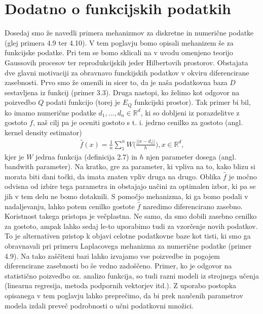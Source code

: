 \documentclass[12pt,a4paper]{amsart}
\theoremstyle{definition} %
\theoremstyle{plain} %
\begin{document}
\section{Dodatno o funkcijskih podatkih}
Dosedaj smo že navedli primera mehanizmov za diskretne in numerične podatke (glej primera 4.9 ter 4.10). V tem poglavju bomo opisali mehanizem še  za funkcijske podatke. Pri tem se bomo sklicali na v uvodu omenjeno teorijo Gaussovih procesov ter reprodukcijskih jeder Hilbertovih prostorov.
\newline
\newline
Obstajata dve glavni motivaciji za obravnavo funckijskih podatkov v okviru diferencirane zasebnosti. Prvo smo že omenili in sicer to, da je naša podatkovna baza $D$ sestavljena iz funkcij (primer 3.3). Druga nastopi, ko želimo kot odgovor na poizvedbo $Q$ podati funkcijo (torej je $E_Q$ funkcijski prostor). Tak primer bi bil, ko imamo numerične podatke $d_1, ..., d_n \in \mathbb{R}^d$, ki so dobljeni iz porazdelitve z gostoto $f$, naš cilj pa je oceniti gostoto s t. i. jedrno cenilko za gostoto (angl. kernel density estimator) 
\begin{gather*}
\hat{f}(x)=\frac{1}{n}\sum_{1}^{n}W\Big(\frac{||x-d_i||}{h}\Big), x \in \mathbb{R}^d,
\end{gather*}
kjer je $W$ jedrna funkcija (definicija 2.7) in $h$ njen parameter dosega (angl. bandwith parameter). Na kratko, gre za parameter, ki vpliva na to, kako blizu si morata biti dani točki, da imata znaten vpliv druga na drugo. Oblika $\hat{f}$ je močno odvisna od izbire tega parametra in obstajajo načini za optimalen izbor, ki pa se jih v tem delu ne bomo dotaknili. S pomočjo mehanizma, ki ga bomo podali v nadaljevanju, lahko potem cenilko gostote $\hat{f}$ naredimo diferencirano zasebno. Koristnost takega pristopa je večplastna. Ne samo, da smo dobili zasebno cenilko za gostoto, ampak lahko sedaj le-to uporabimo tudi za vzorčenje novih podatkov. To je alternativen pristop k objavi celotne podatkovne baze kot tisti, ki smo ga obravnavali pri primeru Laplacovega mehanizma za numerične podatke (primer 4.9). Na tako zaščiteni bazi lahko izvajamo vse poizvedbe in pogojem diferencirane zasebnosti bo še vedno zadoščeno. Primer, ko je odgovor na statistično poizvedbo oz. analizo funkcija, so tudi razni modeli iz strojnega učenja (linearna regresija, metoda podpornih vektorjev itd.). Z uporabo postopka opisanega v tem poglavju lahko preprečimo, da bi prek naučenih parametrov modela izdali preveč podrobnosti o učni podatkovni množici.
\newline
\end{document}
